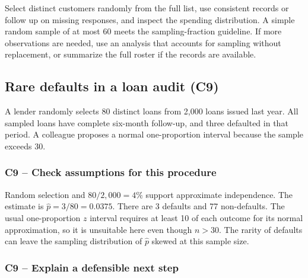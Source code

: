 	Select distinct customers randomly from the full list, use consistent records or follow up on missing responses, and inspect the spending distribution. A simple random sample of at most 60 meets the sampling-fraction guideline. If more observations are needed, use an analysis that accounts for sampling without replacement, or summarize the full roster if the records are available.


	\clearpage

	\subsection{Rare defaults in a loan audit (C9)}
	\label{prob:c9-2}

	A lender randomly selects 80 distinct loans from 2,000 loans issued last year. All sampled loans have complete six-month follow-up, and three defaulted in that period. A colleague proposes a normal one-proportion interval because the sample exceeds 30.


	\label{sol:c9-2-a}
	\subsubsection*{C9 -- Check assumptions for this procedure}

	Random selection and $80/2{,}000=4\%$ support approximate independence. The estimate is $\hat p=3/80=0.0375$. There are 3 defaults and 77 non-defaults. The usual one-proportion $z$ interval requires at least 10 of each outcome for its normal approximation, so it is unsuitable here even though $n>30$. The rarity of defaults can leave the sampling distribution of $\hat p$ skewed at this sample size.


	\label{sol:c9-2-b}
	\subsubsection*{C9 -- Explain a defensible next step}

